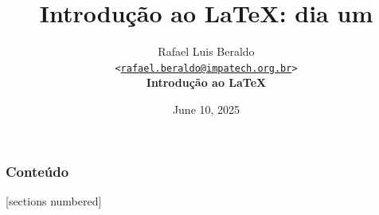 \documentclass[numbering=fraction,aspectratio=169]{beamer}
\title{Introdução ao \LaTeX: dia um}
\author[Rafael Beraldo]{Rafael Luis Beraldo\\
  \texttt{<\href{mailto:rafael.beraldo@impatech.org.br}{rafael.beraldo@impatech.org.br}>}\\
  \textbf{Introdução ao \LaTeX}}
\institute{\IMPATech}
\date{June 10, 2025}
\begin{document}
\frenchspacing

\begin{frame}[plain]{}
  \maketitle
\end{frame}

\begin{frame}
  \frametitle{Conteúdo}
  [sections numbered]
  \begin{multicols}{2}
    \tableofcontents
  \end{multicols}
\end{frame}









\end{document}
